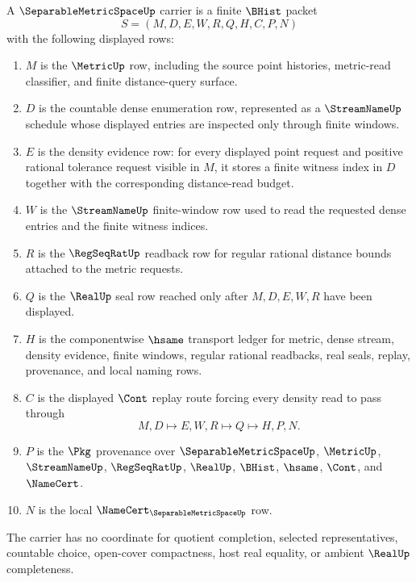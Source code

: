 \begin{definition}
\label{def:separable-metric-space-carrier}
A $\SeparableMetricSpaceUp$ carrier is a finite $\BHist$ packet
$$
S=(M,D,E,W,R,Q,H,C,P,N)
$$
with the following displayed rows:
\begin{enumerate}
\item $M$ is the $\MetricUp$ row, including the source point histories, metric-read classifier, and finite distance-query surface.
\item $D$ is the countable dense enumeration row, represented as a $\StreamNameUp$ schedule whose displayed entries are inspected only through finite windows.
\item $E$ is the density evidence row: for every displayed point request and positive rational tolerance request visible in $M$, it stores a finite witness index in $D$ together with the corresponding distance-read budget.
\item $W$ is the $\StreamNameUp$ finite-window row used to read the requested dense entries and the finite witness indices.
\item $R$ is the $\RegSeqRatUp$ readback row for regular rational distance bounds attached to the metric requests.
\item $Q$ is the $\RealUp$ seal row reached only after $M,D,E,W,R$ have been displayed.
\item $H$ is the componentwise $\hsame$ transport ledger for metric, dense stream, density evidence, finite windows, regular rational readbacks, real seals, replay, provenance, and local naming rows.
\item $C$ is the displayed $\Cont$ replay route forcing every density read to pass through
$$
M,D \longmapsto E,W,R \longmapsto Q \longmapsto H,P,N .
$$
\item $P$ is the $\Pkg$ provenance over $\SeparableMetricSpaceUp$, $\MetricUp$, $\StreamNameUp$, $\RegSeqRatUp$, $\RealUp$, $\BHist$, $\hsame$, $\Cont$, and $\NameCert$.
\item $N$ is the local $\NameCert_{\SeparableMetricSpaceUp}$ row.
\end{enumerate}
The carrier has no coordinate for quotient completion, selected representatives, countable choice, open-cover compactness, host real equality, or ambient $\RealUp$ completeness.
\end{definition}

